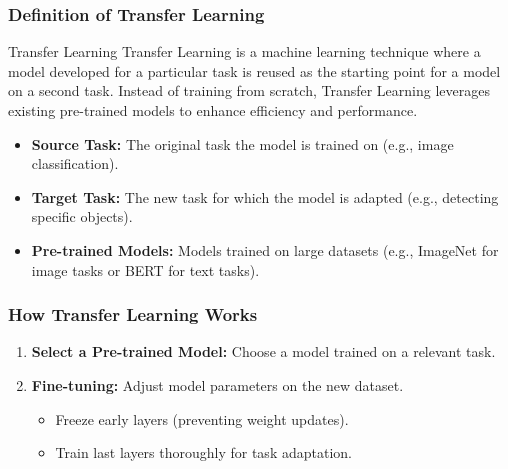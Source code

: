 \documentclass[aspectratio=169]{beamer}
\begin{document}
\begin{frame}[fragile]
    \frametitle{Definition of Transfer Learning}
    \begin{block}{Transfer Learning}
        Transfer Learning is a machine learning technique where a model developed for a particular task is reused as the starting point for a model on a second task. Instead of training from scratch, Transfer Learning leverages existing pre-trained models to enhance efficiency and performance.
    \end{block}
    \begin{itemize}
        \item \textbf{Source Task:} The original task the model is trained on (e.g., image classification).
        \item \textbf{Target Task:} The new task for which the model is adapted (e.g., detecting specific objects).
        \item \textbf{Pre-trained Models:} Models trained on large datasets (e.g., ImageNet for image tasks or BERT for text tasks).
    \end{itemize}
\end{frame}

\begin{frame}[fragile]
    \frametitle{How Transfer Learning Works}
    \begin{enumerate}
        \item \textbf{Select a Pre-trained Model:} Choose a model trained on a relevant task.
        \item \textbf{Fine-tuning:} Adjust model parameters on the new dataset.
        \begin{itemize}
            \item Freeze early layers (preventing weight updates).
            \item Train last layers thoroughly for task adaptation.
        \end{itemize}
    \end{enumerate}
\end{frame}
\end{document}
